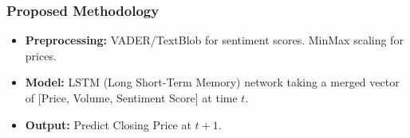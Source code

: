 \documentclass{beamer}
\begin{document}
\begin{frame}
\frametitle{Proposed Methodology}
\begin{itemize}
    \item \textbf{Preprocessing:} VADER/TextBlob for sentiment scores. MinMax scaling for prices.
    \item \textbf{Model:} LSTM (Long Short-Term Memory) network taking a merged vector of [Price, Volume, Sentiment Score] at time $t$.
    \item \textbf{Output:} Predict Closing Price at $t+1$.
\end{itemize}
\end{frame}
\end{document}
